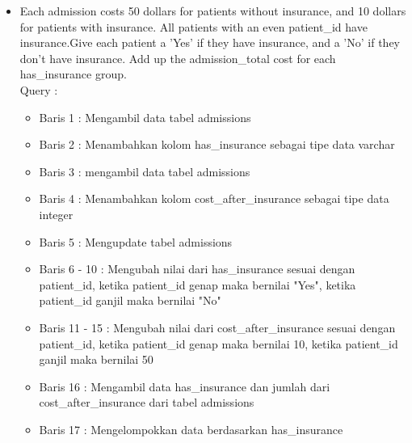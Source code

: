 \documentclass[]{article}
\begin{document}
\begin{itemize}
        \item Each admission costs 50 dollars for patients without insurance, and 10 dollars for patients with insurance. All patients with an even patient\_id have insurance.Give each patient a 'Yes' if they have insurance, and a 'No' if they don't have insurance. Add up the admission\_total cost for each has\_insurance group.
        \\Query :
        
        \begin{itemize}
            \item Baris 1 : Mengambil data tabel admissions
            \item Baris 2 : Menambahkan kolom has\_insurance sebagai tipe data varchar
            \item Baris 3 : mengambil data tabel admissions
            \item Baris 4 : Menambahkan kolom cost\_after\_insurance sebagai tipe data integer
            \item Baris 5 : Mengupdate tabel admissions
            \item Baris 6 - 10 : Mengubah nilai dari has\_insurance sesuai dengan patient\_id, ketika patient\_id genap maka bernilai "Yes", ketika patient\_id ganjil maka bernilai "No"
            \item Baris 11 - 15 : Mengubah nilai dari cost\_after\_insurance sesuai dengan patient\_id, ketika patient\_id genap maka bernilai 10, ketika patient\_id ganjil maka bernilai 50
            \item Baris 16 : Mengambil data has\_insurance dan jumlah dari \\cost\_after\_insurance dari tabel admissions
            \item Baris 17 : Mengelompokkan data berdasarkan has\_insurance
        \end{itemize}

    \end{itemize}
\end{document}
